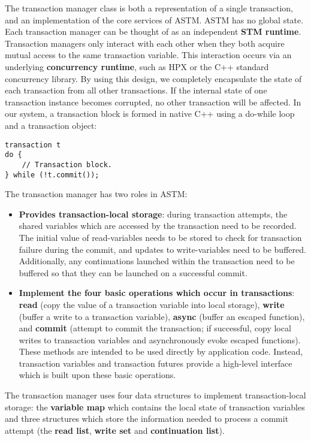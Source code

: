 \documentclass[conference]{IEEEtran}
\begin{document}
The transaction manager class is both a representation of a single transaction, and an implementation of the core services of ASTM. ASTM has no global state. Each transaction manager can be thought of as an independent \textbf{STM runtime}. Transaction managers only interact with each other when they both acquire mutual access to the same transaction variable. This interaction occurs via an underlying \textbf{concurrency runtime}, such as HPX or the C++ standard concurrency library. By using this design, we completely encapsulate the state of each transaction from all other transactions. If the internal state of one transaction instance becomes corrupted, no other transaction will be affected.  In our system, a transaction block is formed in native C++ using a do-while loop and a transaction object:

\begin{lstlisting}
transaction t
do {
    // Transaction block.
} while (!t.commit());
\end{lstlisting}

The transaction manager has two roles in ASTM:

\begin{itemize}
\item \textbf{Provides transaction-local storage}: during transaction attempts, the
shared variables which are accessed by the transaction need to be recorded. The
initial value of read-variables needs to be stored to check for transaction
failure during the commit, and updates to write-variables need to be buffered.
Additionally, any continuations launched within the transaction need to be
buffered so that they can be launched on a successful commit.
\item \textbf{Implement the four basic operations which occur in transactions}:
\textbf{read} (copy the value of a transaction variable into local storage), \textbf{write} (buffer a write to a transaction variable), \textbf{async} (buffer an escaped function), and
\textbf{commit} (attempt to commit the transaction; if successful, copy local writes to transaction variables and asynchronously evoke escaped functions). These methods are intended to be used directly by application code. Instead, transaction variables and transaction futures provide a high-level interface which is built upon these basic operations. 
\end{itemize}

The transaction manager uses four data structures to implement transaction-local
storage: the \textbf{variable map} which contains the local state of transaction variables and three
structures which store the information needed to process a commit attempt (the \textbf{read list}, \textbf{write set} and \textbf{continuation list}). 
\end{document}
